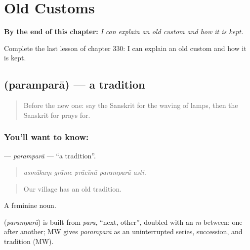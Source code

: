 
\chapter{Old Customs}
\label{ch:sa-old-customs}

\begin{chapteropening}
\textbf{By the end of this chapter:} \emph{I can explain an old custom and how it is kept.}

Complete the last lesson of chapter 330: I can explain an old custom and how it is kept.
\end{chapteropening}

\section[\texorpdfstring{\sk{परम्परा} (paramparā)}{परम्परा (paramparā)}]{ (paramparā) — a tradition}

\label{lesson:SA-C330-parampara}



\begin{quote}
Before the new one: say the Sanskrit for the waving of lamps, then the Sanskrit for prays for.
\end{quote}

\subsection*{You'll want to know: }
\textbf{} — \emph{paramparā} — \textquotedblleft{}a tradition\textquotedblright{}.

\begin{quote}
    
\end{quote}

\begin{quote}
\emph{asmākaṃ grāme prācīnā paramparā asti.}
\end{quote}

\begin{quote}
Our village has an old tradition.
\end{quote}

A feminine noun.

\begin{cousinweb}
\textbf{} (\emph{paramparā}) is built from \emph{para}, \textquotedblleft{}next, other\textquotedblright{}, doubled with an \emph{m} between: one after another; MW gives \emph{paramparā} as an uninterrupted series, succession, and tradition (MW).
\end{cousinweb}

